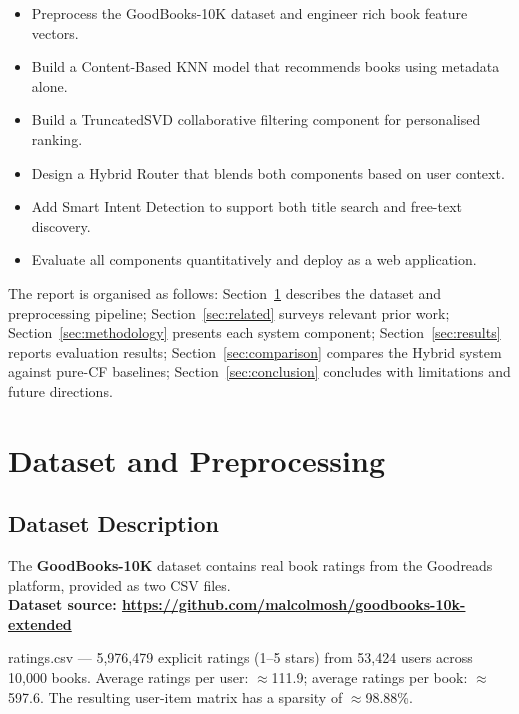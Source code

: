 \documentclass[12pt, a4paper]{article}
\begin{document}
\begin{itemize}[leftmargin=2cm]
  \item Preprocess the GoodBooks-10K dataset and engineer rich book feature vectors.
  \item Build a Content-Based KNN model that recommends books using metadata alone.
  \item Build a TruncatedSVD collaborative filtering component for personalised ranking.
  \item Design a Hybrid Router that blends both components based on user context.
  \item Add Smart Intent Detection to support both title search and free-text discovery.
  \item Evaluate all components quantitatively and deploy as a web application.
\end{itemize}

The report is organised as follows:
Section~\ref{sec:dataset} describes the dataset and preprocessing pipeline;
Section~\ref{sec:related} surveys relevant prior work;
Section~\ref{sec:methodology} presents each system component;
Section~\ref{sec:results} reports evaluation results;
Section~\ref{sec:comparison} compares the Hybrid system against pure-CF baselines;
Section~\ref{sec:conclusion} concludes with limitations and future directions.

\newpage
\section{Dataset and Preprocessing}
\label{sec:dataset}

\subsection{Dataset Description}

The \textbf{GoodBooks-10K} dataset contains real book ratings from the Goodreads platform,
provided as two CSV files. \\
\textbf{Dataset source:
\href{https://github.com/malcolmosh/goodbooks-10k-extended}{https://github.com/malcolmosh/goodbooks-10k-extended}}

ratings.csv --- 5,976,479 explicit ratings (1--5 stars) from
53,424 users across 10,000 books.
Average ratings per user: $\approx$111.9; average ratings per book: $\approx$597.6.
The resulting user-item matrix has a sparsity of $\approx$98.88\%.
\end{document}
